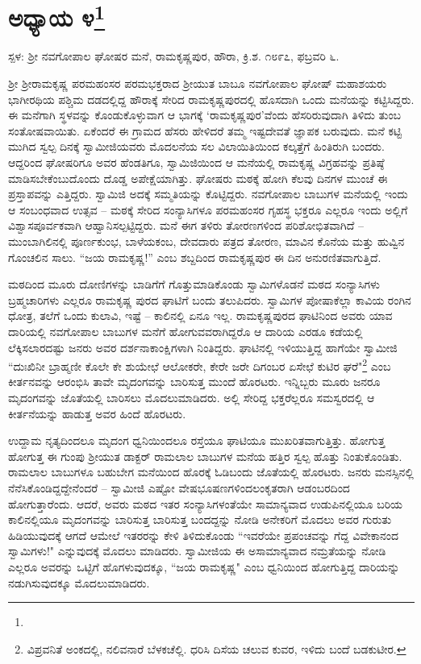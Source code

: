 \newpage

\chapter[ಅಧ್ಯಾಯ ೪]{ಅಧ್ಯಾಯ ೪\protect\footnote{}}

\centerline{ಸ್ಪಳ: ಶ‍್ರೀ ನವಗೋಪಾಲ ಘೋಷರ ಮನೆ, ರಾಮಕೃಷ್ಣಪುರ, ಹೌರಾ, ಕ್ರಿ.ಶ. ೧೮೯೭, ಫಬ್ರವರಿ ೬.}

ಶ‍್ರೀ ಶ‍್ರೀರಾಮಕೃಷ್ಣ ಪರಮಹಂಸರ ಪರಮಭಕ್ತರಾದ ಶ‍್ರೀಯುತ ಬಾಬೂ ನವಗೋಪಾಲ ಘೋಷ್ ಮಹಾಶಯರು ಭಾಗೀರಥಿಯ ಪಶ್ಚಿಮ ದಡದಲ್ಲಿದ್ದ ಹೌರಾಕ್ಕೆ ಸೇರಿದ ರಾಮಕೃಷ್ಣಪುರದಲ್ಲಿ ಹೊಸದಾಗಿ ಒಂದು ಮನೆಯನ್ನು ಕಟ್ಟಿಸಿದ್ದರು. ಈ ಮನೆಗಾಗಿ ಸ್ಥಳವನ್ನು ಕೊಂಡುಕೊಳ್ಳುವಾಗ ಆ ಭಾಗಕ್ಕೆ ‘ರಾಮಕೃಷ್ಣಪುರ’ವೆಂದು ಹೆಸರಿರುವುದಾಗಿ ತಿಳಿದು ತುಂಬ ಸಂತೋಷವಾಯಿತು. ಏಕೆಂದರೆ ಈ ಗ್ರಾಮದ ಹೆಸರು ಹೇಳಿದರೆ ತಮ್ಮ ಇಷ್ಟದೇವತೆ ಜ್ಞಾಪಕ ಬರುವುದು. ಮನೆ ಕಟ್ಟಿ ಮುಗಿದ ಸ್ವಲ್ಪ ದಿನಕ್ಕೆ ಸ್ವಾಮೀಜಿಯವರು ಮೊದಲನೆಯ ಸಲ ವಿಲಾಯಿತಿಯಿಂದ ಕಲ್ಕತ್ತೆಗೆ ಹಿಂತಿರುಗಿ ಬಂದರು. ಆದ್ದರಿಂದ ಘೋಷರಿಗೂ ಅವರ ಹೆಂಡತಿಗೂ, ಸ್ವಾಮಿಜಿಯಿಂದ ಆ ಮನೆಯಲ್ಲಿ ರಾಮಕೃಷ್ಣ ವಿಗ್ರಹವನ್ನು ಪ್ರತಿಷ್ಠೆ ಮಾಡಿಸಬೇಕೆಂಬುದೊಂದು ದೊಡ್ಡ ಅಪೇಕ್ಷೆಯಾಗಿತ್ತು. ಘೋಷರು ಮಠಕ್ಕೆ ಹೋಗಿ ಕೆಲವು ದಿನಗಳ ಮುಂಚೆ ಈ ಪ್ರಸ್ತಾಪವನ್ನು ಎತ್ತಿದ್ದರು. ಸ್ವಾಮಿಜಿ ಅದಕ್ಕೆ ಸಮ್ಮತಿಯನ್ನು ಕೊಟ್ಟಿದ್ದರು. ನವಗೋಪಾಲ ಬಾಬುಗಳ ಮನೆಯಲ್ಲಿ ಇಂದು ಆ ಸಂಬಂಧವಾದ ಉತ್ಸವ – ಮಠಕ್ಕೆ ಸೇರಿದ ಸಂನ್ಯಾಸಿಗಳೂ ಪರಮಹಂಸರ ಗೃಹಸ್ಥ ಭಕ್ತರೂ ಎಲ್ಲರೂ ಇಂದು ಅಲ್ಲಿಗೆ ವಿಶ್ವಾಸಪೂರ್ವಕವಾಗಿ ಆಹ್ವಾನಿಸಲ್ಪಟ್ಟಿದ್ದರು. ಮನೆ ಈಗ ತಳಿರು ತೋರಣಗಳಿಂದ ಪರಿಶೋಭಿತವಾಗಿದೆ – ಮುಂಬಾಗಿಲಿನಲ್ಲಿ ಪೂರ್ಣಕುಂಭ, ಬಾಳೆಯಕಂಬ, ದೇವದಾರು ಪತ್ರದ ತೋರಣ, ಮಾವಿನ ಕೊನೆಯ ಮತ್ತು ಹುವ್ವಿನ ಗೊಂಚಲಿನ ಸಾಲು. “ಜಯ ರಾಮಕೃಷ್ಣ!” ಎಂಬ ಶಬ್ದದಿಂದ ರಾಮಕೃಷ್ಣಪುರ ಈ ದಿನ ಅನುರಣಿತವಾಗುತ್ತಿದೆ.

ಮಠದಿಂದ ಮೂರು ದೋಣಿಗಳನ್ನು ಬಾಡಿಗೆಗೆ ಗೊತ್ತುಮಾಡಿಕೊಂಡು ಸ್ವಾಮಿಗಳೊಡನೆ ಮಠದ ಸಂನ್ಯಾಸಿಗಳು ಬ್ರಹ್ಮಚಾರಿಗಳು ಎಲ್ಲರೂ ರಾಮಕೃಷ್ಣ ಪುರದ ಘಾಟಿಗೆ ಬಂದು ತಲುಪಿದರು. ಸ್ವಾಮಿಗಳ ಪೋಷಾಕೆಲ್ಲಾ ಕಾವಿಯ ರಂಗಿನ ಧೋತ್ರ, ತಲೆಗೆ ಒಂದು ಕುಲಾವಿ, ಇಷ್ಟೆ – ಕಾಲಿನಲ್ಲಿ ಏನೂ ಇಲ್ಲ. ರಾಮಕೃಷ್ಣಪುರದ ಘಾಟಿನಿಂದ ಅವರು ಯಾವ ದಾರಿಯಲ್ಲಿ ನವಗೋಪಾಲ ಬಾಬುಗಳ ಮನೆಗೆ ಹೋಗುವವರಾಗಿದ್ದರೊ ಆ ದಾರಿಯ ಎರಡೂ ಕಡೆಯಲ್ಲಿ ಲೆಕ್ಕಿಸಲಾರದಷ್ಟು ಜನರು ಅವರ ದರ್ಶನಾಕಾಂಕ್ಷಿಗಳಾಗಿ ನಿಂತಿದ್ದರು. ಘಾಟಿನಲ್ಲಿ ಇಳಿಯುತ್ತಿದ್ದ ಹಾಗೆಯೇ ಸ್ವಾಮೀಜಿ “ದುಃಖಿನೀ ಬ್ರಾಹ್ಮಣೀ ಕೊಲೇ ಕೇ ಶುಯೇಛೆ ಆಲೋಕರೇ, ಕೇರೇ ಜರೇ ದಿಗಂಬರ ಏಸೇಛೆ ಕುಟಿರ ಘರೆ"\footnote{ವಿಪ್ರವನಿತೆ ಅಂಕದಲ್ಲಿ, ನಲಿವನಾರೆ ಬೆಳಕಚೆಲ್ಲಿ. ಧರಿಸಿ ದಿಸೆಯ ಚಲುವ ಕುವರ, ಇಳಿದು ಬಂದೆ ಬಡಕುಟೀರ.} ಎಂಬ ಕೀರ್ತನವನ್ನು ಆರಂಭಿಸಿ ತಾವೇ ಮೃದಂಗವನ್ನು ಬಾರಿಸುತ್ತ ಮುಂದೆ ಹೊರಟರು. ಇನ್ನಿಬ್ಬರು ಮೂರು ಜನರೂ ಮೃದಂಗವನ್ನು ಜೊತೆಯಲ್ಲಿ ಬಾರಿಸಲು ಮೊದಲುಮಾಡಿದರು. ಅಲ್ಲಿ ಸೇರಿದ್ದ ಭಕ್ತರೆಲ್ಲರೂ ಸಮಸ್ವರದಲ್ಲಿ ಆ ಕೀರ್ತನೆಯನ್ನು ಹಾಡುತ್ತ ಅವರ ಹಿಂದೆ ಹೊರಟರು.

ಉದ್ದಾಮ ನೃತ್ಯದಿಂದಲೂ ಮೃದಂಗ ಧ್ವನಿಯಿಂದಲೂ ರಸ್ತೆಯೂ ಘಾಟಿಯೂ ಮುಖರಿತವಾಗುತ್ತಿತ್ತು. ಹೋಗುತ್ತ ಹೋಗುತ್ತ ಈ ಗುಂಪು ಶ‍್ರೀಯುತ ಡಾಕ್ಟರ್ ರಾಮಲಾಲ ಬಾಬುಗಳ ಮನೆಯ ಹತ್ತಿರ ಸ್ವಲ್ಪ ಹೊತ್ತು ನಿಂತುಕೊಂಡಿತು. ರಾಮಲಾಲ ಬಾಬುಗಳೂ ಬಹುಬೇಗ ಮನೆಯಿಂದ ಹೊರಕ್ಕೆ ಓಡಿಬಂದು ಜೊತೆಯಲ್ಲಿ ಹೊರಟರು. ಜನರು ಮನಸ್ಸಿನಲ್ಲಿ ನೆನೆಸಿಕೊಂಡಿದ್ದದ್ದೇನೆಂದರೆ – ಸ್ವಾಮೀಜಿ ಎಷ್ಟೋ ವೇಷಭೂಷಣಗಳಿಂದಲಂಕೃತರಾಗಿ ಆಡಂಬರದಿಂದ ಹೋಗುತ್ತಾರೆಂದು. ಆದರೆ, ಅವರು ಮಠದ ಇತರ ಸಂನ್ಯಾಸಿಗಳಂತೆಯೇ ಸಾಮಾನ್ಯವಾದ ಉಡುಪಿನಲ್ಲಿಯೂ ಬರಿಯ ಕಾಲಿನಲ್ಲಿಯೂ ಮೃದಂಗವನ್ನು ಬಾರಿಸುತ್ತ ಬಾರಿಸುತ್ತ ಬಂದದ್ದನ್ನು ನೋಡಿ ಅನೇಕರಿಗೆ ಮೊದಲು ಅವರ ಗುರುತು ಹಿಡಿಯುವುದಕ್ಕೆ ಆಗದೆ ಆಮೇಲೆ ಇತರರನ್ನು ಕೇಳಿ ತಿಳಿದುಕೊಂಡು “ಇವರೆಯೇ ಪ್ರಪಂಚವನ್ನು ಗೆದ್ದ ವಿವೇಕಾನಂದ ಸ್ವಾಮಿಗಳು!" ಎನ್ನುವುದಕ್ಕೆ ಮೊದಲು ಮಾಡಿದರು. ಸ್ವಾಮೀಜಿಯ ಈ ಅಸಾಮಾನ್ಯವಾದ ನಮ್ರತೆಯನ್ನು ನೋಡಿ ಎಲ್ಲರೂ ಅವರನ್ನು ಒಟ್ಟಿಗೆ ಹೊಗಳುವುದಕ್ಕೂ, “ಜಯ ರಾಮಕೃಷ್ಣ" ಎಂಬ ಧ್ವನಿಯಿಂದ ಹೋಗುತ್ತಿದ್ದ ದಾರಿಯನ್ನು ನಡುಗಿಸುವುದಕ್ಕೂ ಮೊದಲುಮಾಡಿದರು.

